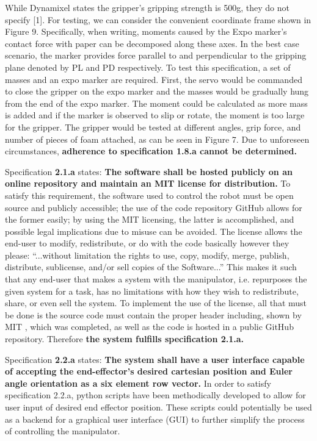 While Dynamixel states the gripper’s gripping strength is 500g, they do not specify [1]. For testing, we can consider the convenient coordinate frame shown in Figure 9. Specifically, when writing, moments caused by the Expo marker’s contact force with paper can be decomposed along these axes. In the best case scenario, the marker provides force parallel to and perpendicular to the gripping plane denoted by PL and PD respectively.
To test this specification, a set of masses and an expo marker  are required. First, the servo would be commanded to close the gripper on the expo marker and the masses would be gradually hung from the end of the expo marker. The moment could be calculated as more mass is added and if the marker is observed to slip or rotate, the moment is too large for the gripper. The gripper would be tested at different angles, grip force, and number of pieces of foam attached, as can be seen in Figure 7. Due to unforeseen circumstances, \textbf{adherence to specification 1.8.a cannot be determined.}


Specification \textbf{2.1.a} states: \textbf{The software shall be hosted publicly on an online repository and maintain an MIT license for distribution.} To satisfy this requirement, the software used to control the robot must be open source and publicly accessible; the use of the code repository GitHub allows for the former easily; by using the MIT licensing, the latter is accomplished, and possible legal implications due to misuse can be avoided. The license allows the end-user to modify, redistribute, or do with the code basically however they please: “...without limitation the rights to use, copy, modify, merge, publish, distribute, sublicense, and/or sell copies of the Software...”\cite{mit} This makes it such that any end-user that makes a system with the manipulator, i.e. repurposes the given system for a task, has no limitations with how they wish to redistribute, share, or even sell the system. To implement the use of the license, all that must be done is the source code must contain the proper header including, shown by MIT \cite{mit}, which was completed, as well as the code is hosted in a public GitHub repository. Therefore \textbf{the system fulfills specification 2.1.a.}


Specification \textbf{2.2.a} states: \textbf{The system shall have a user interface capable of accepting the end-effector’s desired cartesian position and Euler angle orientation as a six element row vector.} In order to satisfy specification 2.2.a, python scripts have been methodically developed to allow for user input of desired end effector position. These scripts could potentially be used as a backend for a graphical user interface (GUI) to further simplify the process of controlling the manipulator.

